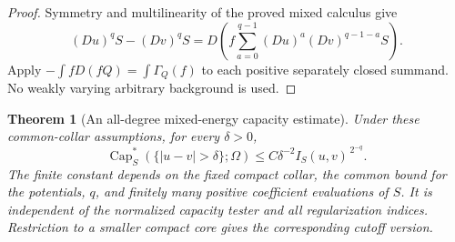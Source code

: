 \documentclass[11pt,a4paper]{article}
\numberwithin{equation}{section}
\newtheorem{theorem}{Theorem}[section]
\theoremstyle{definition}
\theoremstyle{remark}
\begin{document}
\begin{proof}
Symmetry and multilinearity of the proved mixed calculus give
\[
 (Du)^qS-(Dv)^qS
   =D\left(f\sum_{a=0}^{q-1}(Du)^a(Dv)^{q-1-a}S\right).
\]
Apply $-\int fD(fQ)=\int\Gamma_Q(f)$ to each positive separately
closed summand. No weakly varying arbitrary background is used.
\end{proof}

\begin{theorem}[An all-degree mixed-energy capacity estimate]
\label{thm:r3-I-capacity}
Under these common-collar assumptions, for every $\delta>0$,
\begin{equation}
 \label{eq:r3-all-degree-I-capacity}
 \operatorname{Cap}_S^*(\{|u-v|>\delta\};\Omega)
       \leq C\delta^{-2} I_S(u,v)^{\,2^{-q}}.
\end{equation}
The finite constant depends on the fixed compact collar, the common
bound for the potentials, $q$, and finitely many positive coefficient
evaluations of $S$. It is independent of the normalized capacity
tester and all regularization indices. Restriction to a smaller
compact core gives the corresponding cutoff version.
\end{theorem}
\end{document}
